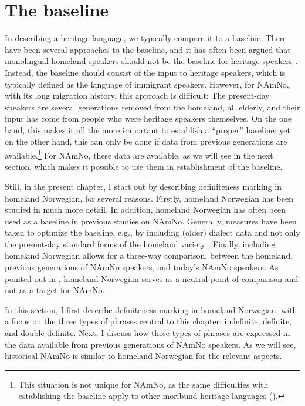 \documentclass[output=paper]{langscibook}
\begin{document}
\section{The baseline} \label{Sect-Baseline}
In describing a heritage language, we typically compare it to a baseline. There have been several approaches to the baseline, and it has often been argued that monolingual homeland speakers should not be the baseline for heritage speakers \citep[e.g.,][11--16]{Polinsky2018}. Instead, the baseline should consist of the input to heritage speakers, which is typically defined as the language of immigrant speakers. However, for NAmNo, with its long migration history, this approach is difficult: The present-day speakers are several generations removed from the homeland, all elderly, and their input has come from people who were heritage speakers themselves. On the one hand, this makes it all the more important to establish a ``proper'' baseline; yet on the other hand, this can only be done if data from previous generations are available.\footnote{This situation is not unique for NAmNo, as the same difficulties with establishing the baseline apply to other moribund heritage languages (\citealt{Putnametal2018, DAlessandroetal2021}).} For NAmNo, these data are available, as we will see in the next section, which makes it possible to use them in establishment of the baseline.

Still, in the present chapter, I start out by describing definiteness marking in homeland Norwegian, for several reasons. Firstly, homeland Norwegian has been studied in much more detail. In addition, homeland Norwegian has often been used as a baseline in previous studies on NAmNo. Generally, measures have been taken to optimize the baseline, e.g., by including (older) dialect data and not only the present-day standard forms of the homeland variety \citep[for example,][]{JohannessenLarsson2015}. Finally, including homeland Norwegian allows for a three-way comparison, between the homeland, previous generations of NAmNo speakers, and today’s NAmNo speakers. As pointed out in , homeland Norwegian serves as a neutral point of comparison and not as a target for NAmNo.

In this section, I first describe definiteness marking in homeland Norwegian, with a focus on the three types of phrases central to this chapter: indefinite, definite, and double definite. Next, I discuss how these types of phrases are expressed in the data available from previous generations of NAmNo speakers. As we will see, historical NAmNo is similar to homeland Norwegian for the relevant aspects.
\end{document}

